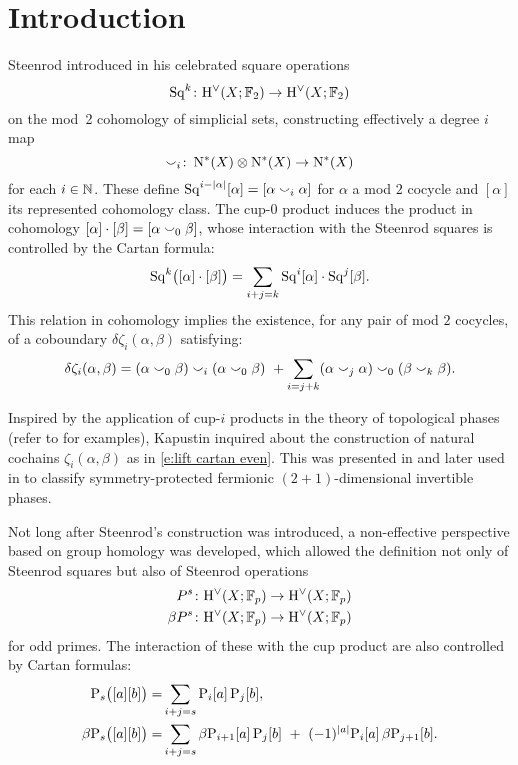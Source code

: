 
\section{Introduction} \label{s:introduction}

Steenrod introduced in \cite{steenrod1947products} his celebrated square operations
\[
\operatorname{Sq}^k \colon \mathrm{H}^\vee(X; {\mathbb{F}_2}) \to \mathrm{H}^\vee(X; {\mathbb{F}_2})
\]
on the mod~2 cohomology of simplicial sets, constructing effectively a degree $i$ map
\[
\smallsmile_i \colon \operatorname{N^{\ast}}(X) \otimes \operatorname{N^{\ast}}(X) \to \operatorname{N^{\ast}}(X)
\]
for each $i \in \mathbb{N}$.
These define $\operatorname{Sq}^{i-\lvert\alpha\rvert}[\alpha] = [\alpha \smallsmile_i \alpha]$ for $\alpha$ a mod $2$ cocycle and $[\alpha]$ its represented cohomology class.
The cup-$0$ product induces the product in cohomology $[\alpha] \cdot [\beta] = [\alpha \smallsmile_0 \beta]$, whose interaction with the Steenrod squares is controlled by the Cartan formula:
\[
\operatorname{Sq}^k\!\big([\alpha] \cdot [\beta]\big) = \sum_{i+j=k} \operatorname{Sq}^i [\alpha] \cdot \operatorname{Sq}^j[\beta].
\]
This relation in cohomology implies the existence, for any pair of mod $2$ cocycles, of a coboundary $\delta\zeta_i(\alpha,\beta)$ satisfying:
\begin{equation}\label{e:lift cartan even}
	\delta\zeta_i(\alpha, \beta) =
	(\alpha \smallsmile_0 \beta) \smallsmile_i (\alpha \smallsmile_0 \beta) \ +
	\sum_{i=j+k} (\alpha \smallsmile_j \alpha) \smallsmile_0 (\beta \smallsmile_k \beta).
\end{equation}

Inspired by the application of cup-$i$ products in the theory of topological phases (refer to \cite{kapustin2015cobordism, gaiotto2016spin, kapustin2017fermionic} for examples), Kapustin inquired about the construction of natural cochains $\zeta_i(\alpha, \beta)$ as in \eqref{e:lift cartan even}.
This was presented in \cite{medina2020cartan} and later used in \cite{barkeshli2021classification} to classify symmetry-protected fermionic $(2+1)$-dimensional invertible phases.

Not long after Steenrod's construction was introduced, a non-effective perspective based on group homology was developed, which allowed the definition not only of Steenrod squares but also of Steenrod operations
\begin{align*}
	P^s \colon& \mathrm{H}^\vee(X; {\mathbb{F}_p}) \to \mathrm{H}^\vee(X; {\mathbb{F}_p}) \\
	\beta P^s \colon& \mathrm{H}^\vee(X; {\mathbb{F}_p}) \to \mathrm{H}^\vee(X; {\mathbb{F}_p})
\end{align*}
for odd primes.
The interaction of these with the cup product are also controlled by Cartan formulas:
\begin{align*}
	\mathrm{P}_s\big([a][b]\big) =&
	\sum_{i+j=s} \mathrm{P}_i[a] \, \mathrm{P}_j[b], \\
	\beta\mathrm{P}_s\big([a][b]\big) =&
	\sum_{i+j=s} \beta\mathrm{P}_{i+1}[a] \, \mathrm{P}_j[b] \ +\ (-1)^{\lvert a\rvert} \mathrm{P}_i[a] \, \beta\mathrm{P}_{j+1}[b].
\end{align*}

